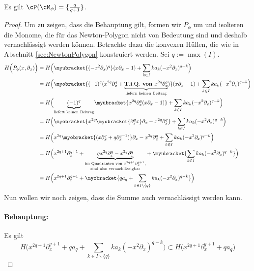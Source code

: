 \begin{lem}
Es gilt $\cP(\cM_{\phi})=\{\frac{q}{q+1}\}$.
\end{lem}
\begin{proof}
\begin{comment}
\cite[5.b.]{sabbah_Fourier-local}
\end{comment}
Um zu zeigen, dass die Behauptung gilt, formen wir $P_{\phi}$ um und isolieren
die Monome, die für das Newton-Polygon nicht von Bedeutung sind und deshalb
vernachlässigt werden können. Betrachte dazu die konvexen Hüllen, die wie in
Abschnitt \ref{sec:NewtonPolygon} konstruiert werden. Sei $q:=\max(I)$.
\begin{align*}
H\Big(P_{\phi}(x,\partial_x)\Big) &= H\Big(\myubracket{(-x^2\partial_x)^{q}}
  (x\partial_x-1) + \sum_{k\in I}k a_k(-x^2\partial_x)^{q-k}\Big)
\\&= H\Big(\myobracket{(-1)^q(x^{2q}\partial_x^q
  + \underset{\text{liefern keinen Beitrag}}{
  \underbrace{\textbf{T.i.Q. von }x^{2q}\partial_x^q}})}
  (x\partial_x - 1) + \sum_{k\in I}k a_k(-x^2\partial_x)^{q-k} \Big)
\\&= H\Big(\underset{\text{liefert keinen Beitrag}}{\underbrace{(-1)^q}}
  \myubracket{x^{2q}\partial_x^q (x\partial_x - 1)}
  + \sum_{k\in I}k a_k(-x^2\partial_x)^{q-k} \Big)
\\&= H\Big(\myobracket{x^{2q}\myubracket{\partial_x^q x}\partial_x
  - x^{2q}\partial_x^q} + \sum_{k\in I}k a_k(-x^2\partial_x)^{q-k} \Big)
\\&= H\Big(x^{2q}\myobracket{(x\partial_x^q + q\partial_x^{q-1})}\partial_x
  - x^{2q}\partial_x^q + \sum_{k\in I}k a_k(-x^2\partial_x)^{q-k} \Big)
\\&= H\Big(x^{2q + 1}\partial_x^{q + 1}
  + \underset{\text{sind also vernachlässigbar}}{
  \underset{\text{im Quadranten von $x^{2q + 1}\partial_x^{q + 1}$,}}{
  \underbrace{qx^{2q}\partial_x^{q} - x^{2q}\partial_x^q}}}
  +\myubracket{ \sum_{k\in I}k a_k(-x^2\partial_x)^{q-k}} \Big)
\\&= H\Big(x^{2q + 1}\partial_x^{q + 1} +\myobracket{ qa_q
  + \sum_{k\in I\backslash\{q\}}k a_k(-x^2\partial_x)^{q-k}} \Big)
\end{align*}
Nun wollen wir noch zeigen, dass die Summe auch vernachlässigt werden kann.
\paragraph{Behauptung:} Es gilt
\[
H\Big(x^{2q + 1}\partial_x^{q + 1} + qa_q
  + \sum_{k\in I\backslash\{q\}}k a_k(-x^2\partial_x)^{q-k} \Big)
\subset H\Big(x^{2q + 1}\partial_x^{q + 1} + qa_q \Big)
\]

\end{proof}
